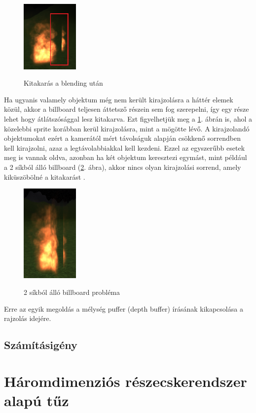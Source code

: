 \begin{figure}
 \caption{Kitakarás a blending után}
 \centering
 \includegraphics[width=0.25\textwidth]{kepek/billboardOverlap.png}
 \label{fig:billboardOverlap}
\end{figure}
 Ha ugyanis valamely objektum még nem került kirajzolásra a háttér elemek közül, akkor a billboard teljesen áttetsző részein sem fog szerepelni, így egy része lehet hogy átlátszósággal lesz kitakarva. Ezt figyelhetjük meg a \ref{fig:billboardOverlap}. ábrán is, ahol a közelebbi sprite korábban kerül kirajzolásra, mint a mögötte lévő. A kirajzolandó objektumokat ezért a kamerától mért távolságuk alapján csökkenő sorrendben kell kirajzolni, azaz a legtávolabbiakkal kell kezdeni. Ezzel az egyszerűbb esetek meg is vannak oldva, azonban ha két objektum keresztezi egymást, mint például a 2 síkból álló billboard (\ref{fig:doubleBillboard}. ábra), akkor nincs olyan kirajzolási sorrend, amely kiküszöbölné a kitakarást . 

\begin{figure}
 \caption{2 síkból álló billboard probléma}
 \centering
 \includegraphics[width=0.25\textwidth]{kepek/doubleBillboard1.png}
 \label{fig:doubleBillboard}
\end{figure}
Erre az egyik megoldás a mélység puffer (depth buffer) írásának kikapcsolása a rajzolás idejére.

\subsection{Számításigény}


\section{Háromdimenziós részecskerendszer alapú tűz}
















